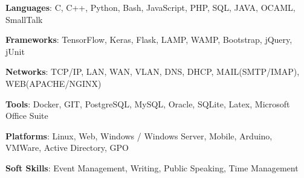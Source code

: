 
\textbf{Languages}: {C, C++, Python, Bash, JavaScript, PHP, SQL, JAVA, OCAML, SmallTalk}

\textbf{Frameworks}: {TensorFlow, Keras, Flask, LAMP, WAMP, Bootstrap, jQuery, jUnit}
	
\textbf{Networks}: {TCP/IP, LAN, WAN, VLAN, DNS, DHCP, MAIL(SMTP/IMAP), WEB(APACHE/NGINX)}
	
\textbf{Tools}: {Docker, GIT, PostgreSQL, MySQL, Oracle, SQLite, Latex, Microsoft Office Suite}

\textbf{Platforms}: {Linux, Web, Windows / Windows Server, Mobile, Arduino, VMWare, Active Directory, GPO}

\textbf{Soft Skills}: { Event Management, Writing, Public Speaking, Time Management}